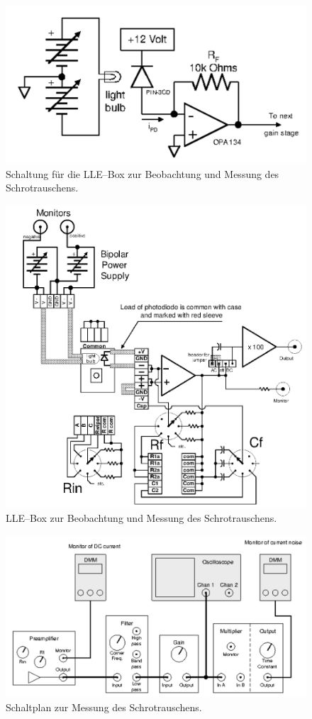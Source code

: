\documentclass[sn-mathphys-num,iicol]{sn-jnl}
\theoremstyle{thmstyleone}
\theoremstyle{thmstyletwo}
\theoremstyle{thmstylethree}
\begin{document}
\begin{figure}[t]
	\centering
	\includegraphics[width=.5\textwidth]{425_schaltplan_visualisierung_schort_LLE.png}
	\caption{Schaltung für die LLE--Box zur Beobachtung und Messung des Schrotrauschens.\cite{anleitung425}} \label{fig:schrot_lle_beob}
\end{figure}
\begin{figure}[t]
	\centering
	\includegraphics[width=.5\textwidth]{425_schaltplan_messung_schrot_LLE.png}
	\caption{LLE--Box zur Beobachtung und Messung des Schrotrauschens.\cite{anleitung425}} \label{fig:schrot_lle_mess}
\end{figure}
\begin{figure}[t]
	\centering
	\includegraphics[width=.5\textwidth]{425_schaltplan_messung_schrot.png}
	\caption{Schaltplan zur Messung des Schrotrauschens.\cite{anleitung425}} \label{fig:schaltplan_schrot_mess}
\end{figure}
\end{document}
